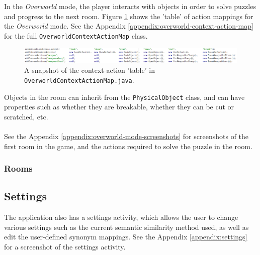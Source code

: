 \documentclass[11pt]{article}
\begin{document}
In the \textit{Overworld} mode, the player interacts with objects in order to solve puzzles and progress to the next room. Figure \ref{fig:overworld-context-action-map} shows the 'table' of action mappings for the \textit{Overworld} mode. See the Appendix \ref{appendix:overworld-context-action-map} for the full \texttt{OverworldContextActionMap} class.

\begin{center}
\begin{figure}[H]
\begin{center}
  \includegraphics[width=\linewidth]{overworld-context-action-map.png}
  \caption{A snapshot of the context-action 'table' in \texttt{OverworldContextActionMap.java}.}
  \label{fig:overworld-context-action-map}
  \end{center}
\end{figure}
\end{center}

Objects in the room can inherit from the \texttt{PhysicalObject} class, and can have properties such as whether they are breakable, whether they can be cut or scratched, etc.
\\
\\
See the Appendix \ref{appendix:overworld-mode-screenshots} for screenshots of the first room in the game, and the actions required to solve the puzzle in the room.

\subsubsection{Rooms}

\subsection{Settings}

The application also has a settings activity, which allows the user to change various settings such as the current semantic similarity method used, as well as edit the user-defined synonym mappings. See the Appendix \ref{appendix:settings} for a screenshot of the settings activity.
\end{document}
